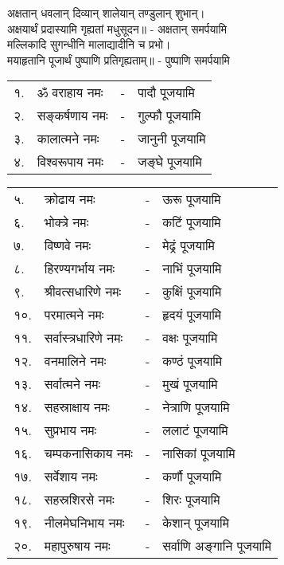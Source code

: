 अक्षतान् धवलान् दिव्यान् शालेयान् तण्डुलान् शुभान्।\\
अक्षयार्थं प्रदास्यामि गृह्यतां मधुसूदन॥ - अक्षतान् समर्पयामि\\

मल्लिकादि सुगन्धीनि मालाद्यादीनि च प्रभो। \\
मयाहृतानि पूजार्थं पुष्पाणि प्रतिगृह्यताम्॥ - पुष्पाणि समर्पयामि

\begin{tabular}{llll}
१.&	ॐ वराहाय नमः &-& पादौ पूजयामि	\\
२.&	सङ्कर्षणाय नमः &-& गुल्फौ पूजयामि\\
३.&	कालात्मने नमः &-& जानुनी पूजयामि	\\
४.&	विश्वरूपाय नमः &-& जङ्घे पूजयामि\\
\end{tabular}

\begin{tabular}{llll}
५.&	क्रोढाय नमः &-& ऊरू पूजयामि	\\
६.&	भोक्त्रे नमः &-& कटिं पूजयामि	\\
७.&	विष्णवे नमः &-& मेढ्रं पूजयामि		\\
८.&	हिरण्यगर्भाय नमः &-& नाभिं पूजयामि\\
९.&	श्रीवत्सधारिणे नमः &-& कुक्षिं पूजयामि	\\
१०.& परमात्मने नमः &-& हृदयं पूजयामि\\
११.& सर्वास्त्रधारिणे नमः &-& वक्षः पूजयामि	\\
१२.& वनमालिने नमः &-& कण्ठं पूजयामि\\
१३.& सर्वात्मने नमः &-& मुखं पूजयामि	\\
१४.&	 सहस्राक्षाय नमः &-& नेत्राणि पूजयामि\\
१५.& सुप्रभाय नमः &-& ललाटं पूजयामि	\\
१६.& चम्पकनासिकाय नमः &-& नासिकां पूजयामि	\\
१७.& सर्वेशाय नमः &-& कर्णौ पूजयामि	\\
१८.& सहस्रशिरसे नमः &-& शिरः पूजयामि\\
१९.& नीलमेघनिभाय नमः &-& केशान् पूजयामि	\\
२०.& महापुरुषाय नमः &-& सर्वाणि अङ्गानि पूजयामि	\\
\end{tabular}

